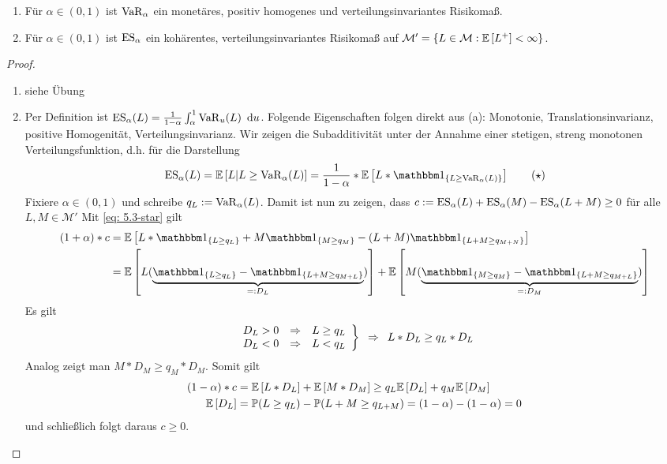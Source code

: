 \begin{theorem}
	\begin{enumerate}[label=(\alph*), nolistsep]
		\item Für $\alpha \in (0,1)$ ist $\operatorname{VaR}_\alpha$ ein monetäres, positiv homogenes und verteilungsinvariantes Risikomaß.
		\item Für $\alpha \in (0,1)$ ist $\operatorname{ES}_\alpha$ ein kohärentes, verteilungsinvariantes Risikomaß auf $\mathcal{M}' = \left\{ L \in \mathcal{M}: \mathbb{E} \left[ L^+ \right] < \infty \right\}$.
	\end{enumerate}
\end{theorem}
\begin{proof}
	\begin{enumerate}
		\item siehe Übung
		\item Per Definition ist $\operatorname{ES}_\alpha(L) = \frac{1}{1-\alpha} \int_\alpha^1 \operatorname{VaR}_u(L) \enskip \mathrm{d}u$. 
		Folgende Eigenschaften folgen direkt aus (a): Monotonie, Translationsinvarianz, positive Homogenität, Verteilungsinvarianz. Wir zeigen die Subadditivität unter der Annahme einer stetigen, streng monotonen Verteilungsfunktion, d.h. für die Darstellung 
		\begin{equation*}
		\ES_\alpha(L) = \EW[L | L \ge \VaR_\alpha(L)] = \frac{1}{1-\alpha} * \EW[L * \one_{\menge{L \ge \VaR_\alpha(L)}}]
		\tag{$\star$} \label{eq: 5.3-star}
		\end{equation*}Fixiere $\alpha \in (0,1)$ und schreibe $q_L \mathrel{:=} \operatorname{VaR}_\alpha(L)$. Damit ist nun zu zeigen, dass $c \mathrel{:=} \operatorname{ES}_\alpha(L) + \operatorname{ES}_\alpha(M) - \operatorname{ES}_\alpha(L+M) \ge 0$ für alle $L, M \in \mathcal{M}'$
		Mit \eqref{eq: 5.3-star} gilt
		\begin{equation*}
		\begin{aligned}
			(1+\alpha) * c 
			&= \EW[{L * \one_{\menge{L \ge q_L}} + M \one_{\menge{M \ge q_M}} - (L+M) \one_{\menge{L+M \ge q_{M+N}}}}] \\
			&= \EW[{L(\underbrace{\one_{\menge{L \ge q_L}} - \one_{\menge{L+M \ge q_{M+L}}}}_{\defqe D_L})}] + \EW[{M (\underbrace{\one_{\menge{M \ge q_M}} - \one_{\menge{L+M \ge q_{M+L}}}}_{\defqe D_M})}]
		\end{aligned}
		\end{equation*}
	Es gilt
	\begin{equation*}
	\left. \begin{array}{rcl}
	D_L > 0 & \Rightarrow & L \ge q_L \\
	D_L < 0 & \Rightarrow & L < q_L
	\end{array}
	\right\} \enskip \Rightarrow \enskip L * D_L \ge q_L *  D_L
	\end{equation*}
	Analog zeigt man $M * D_M \ge q_M * D_M$. Somit gilt
	\begin{equation*}
	\begin{aligned}
	(1-\alpha) * c &= \mathbb{E} \left[ L * D_L \right] + \mathbb{E} \left[ M * D_M \right] \ge q_L \mathbb{E} \left[ D_L \right] + q_M \mathbb{E} \left[ D_M \right] \\
	\mathbb{E} \left[ D_L \right] &= \mathbb{P}(L \ge q_L) - \mathbb{P}(L+M \ge q_{L+M}) = (1-\alpha) - (1-\alpha) = 0
	\end{aligned}
	\end{equation*}
	und schließlich folgt daraus $c \ge 0$.
\end{enumerate}
\end{proof}

